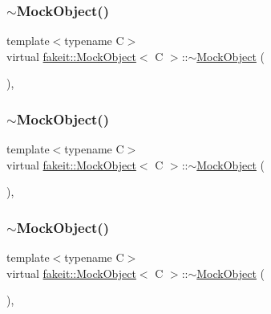 \subsubsection{\texorpdfstring{$\sim$MockObject()}{~MockObject()}\hspace{0.1cm}{\footnotesize\ttfamily [3/9]}}
{\footnotesize\ttfamily template$<$typename C$>$ \\
virtual \mbox{\hyperlink{structfakeit_1_1MockObject}{fakeit\+::\+Mock\+Object}}$<$ C $>$\+::$\sim$\mbox{\hyperlink{structfakeit_1_1MockObject}{Mock\+Object}} (\begin{DoxyParamCaption}{ }\end{DoxyParamCaption})\hspace{0.3cm}{\ttfamily [inline]}, {\ttfamily [virtual]}}

\mbox{\label{structfakeit_1_1MockObject_aba533bcf929bb012934089f767e9863c}} 
\subsubsection{\texorpdfstring{$\sim$MockObject()}{~MockObject()}\hspace{0.1cm}{\footnotesize\ttfamily [4/9]}}
{\footnotesize\ttfamily template$<$typename C$>$ \\
virtual \mbox{\hyperlink{structfakeit_1_1MockObject}{fakeit\+::\+Mock\+Object}}$<$ C $>$\+::$\sim$\mbox{\hyperlink{structfakeit_1_1MockObject}{Mock\+Object}} (\begin{DoxyParamCaption}{ }\end{DoxyParamCaption})\hspace{0.3cm}{\ttfamily [inline]}, {\ttfamily [virtual]}}

\mbox{\label{structfakeit_1_1MockObject_aba533bcf929bb012934089f767e9863c}} 
\subsubsection{\texorpdfstring{$\sim$MockObject()}{~MockObject()}\hspace{0.1cm}{\footnotesize\ttfamily [5/9]}}
{\footnotesize\ttfamily template$<$typename C$>$ \\
virtual \mbox{\hyperlink{structfakeit_1_1MockObject}{fakeit\+::\+Mock\+Object}}$<$ C $>$\+::$\sim$\mbox{\hyperlink{structfakeit_1_1MockObject}{Mock\+Object}} (\begin{DoxyParamCaption}{ }\end{DoxyParamCaption})\hspace{0.3cm}{\ttfamily [inline]}, {\ttfamily [virtual]}}

